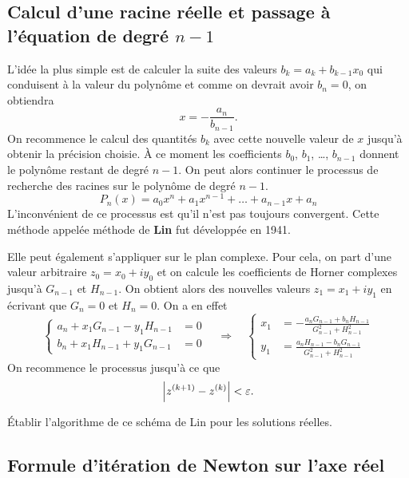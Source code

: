 \subsection{Calcul d'une racine réelle et passage à l'équation de degré
\texorpdfstring{$n-1$}{n-1}}

L'idée la plus simple est de calculer la suite des valeurs
$b_k = a_k + b_{k-1}x_0$ qui conduisent à la valeur du polynôme et comme on
devrait avoir $b_n = 0$, on obtiendra
\[
  x = -\frac{a_n}{b_{n-1}} .
\]
On recommence le calcul des quantités $b_k$ avec cette nouvelle valeur de $x$
jusqu'à obtenir la précision choisie. À ce moment les coefficients $b_0$,
$b_1$, \dots, $b_{n-1}$ donnent le polynôme restant de degré $n-1$. On peut
alors continuer le processus de recherche des racines sur le polynôme de
degré $n-1$.
\[
  P_n(x) = a_0x^n + a_1x^{n-1} + \dots + a_{n-1}x + a_n
\]
L'inconvénient de ce processus est qu'il n'est pas toujours convergent. Cette
méthode appelée méthode de \textbf{Lin} fut développée en 1941.

Elle peut également s'appliquer sur le plan complexe. Pour cela, on part d'une
valeur arbitraire $z_0 = x_0 + iy_0$ et on calcule les coefficients de Horner
complexes jusqu'à $G_{n-1}$ et $H_{n-1}$. On obtient alors des nouvelles
valeurs $z_1 = x_1 + iy_1$ en écrivant que $G_n = 0$ et $H_n = 0$. On a en
effet
\[
  \left\{
  \begin{aligned}
    a_n + x_1G_{n-1} - y_1H_{n-1} &= 0\\
    b_n + x_1H_{n-1} + y_1G_{n-1} &= 0
  \end{aligned}
  \right.
  \quad\Longrightarrow\quad
  \left\{
  \begin{aligned}
    x_1 &= -\frac{a_nG_{n-1} + b_nH_{n-1}}{G_{n-1}^2 + H_{n-1}^2}\\[0.4em]
    y_1 &= \frac{a_nH_{n-1} - b_nG_{n-1}}{G_{n-1}^2 + H_{n-1}^2}
  \end{aligned}
  \right.
\]
On recommence le processus jusqu'à ce que
\[
  \left|z^{(k+1)} - z^{(k)}\right| < \varepsilon .
\]

\begin{exercice}
Établir l'algorithme de ce schéma de Lin pour les solutions réelles.
\end{exercice}

\subsection{Formule d'itération de Newton sur l'axe réel}

